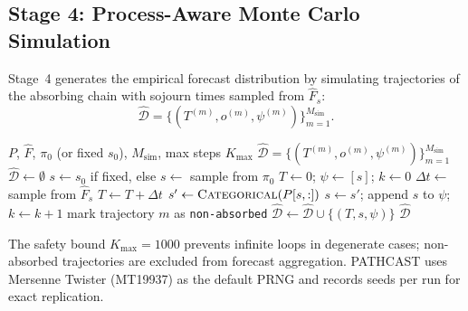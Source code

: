 \subsection{Stage 4: Process-Aware Monte Carlo Simulation}
\label{sec:stages-s4}

Stage~4 generates the empirical forecast distribution by simulating
trajectories of the absorbing chain with sojourn times sampled from
$\hat{F}_s$:
\begin{equation}
\label{eq:forecast-distribution}
\hat{\mathcal{D}}
  = \{(T^{(m)}, o^{(m)}, \psi^{(m)})\}_{m=1}^{M_{\text{sim}}}.
\end{equation}

\begin{algorithm}[htbp]
\caption{Process-Aware Monte Carlo Simulation}
\label{alg:mc-full}
\begin{algorithmic}[1]
\REQUIRE $P$, $\hat{F}$, $\pi_0$ (or fixed $s_0$), $M_{\text{sim}}$,
    max steps $K_{\max}$
\ENSURE $\hat{\mathcal{D}}
    = \{(T^{(m)}, o^{(m)}, \psi^{(m)})\}_{m=1}^{M_{\text{sim}}}$
\STATE $\hat{\mathcal{D}} \gets \emptyset$
    \STATE $s \gets s_0$ if fixed, else $s \gets$ sample from $\pi_0$
    \STATE $T \gets 0$; $\psi \gets [s]$; $k \gets 0$
        \STATE $\Delta t \gets$ sample from $\hat{F}_s$
        \STATE $T \gets T + \Delta t$
        \STATE $s' \gets \textsc{Categorical}(P[s, :])$
        \STATE $s \gets s'$; append $s$ to $\psi$; $k \gets k + 1$
    \ENDWHILE
        \STATE mark trajectory $m$ as \texttt{non-absorbed}
    \ENDIF
    \STATE $\hat{\mathcal{D}} \gets \hat{\mathcal{D}}
        \cup \{(T, s, \psi)\}$
\ENDFOR
\RETURN $\hat{\mathcal{D}}$
\end{algorithmic}
\end{algorithm}

The safety bound $K_{\max} = 1000$ prevents infinite loops in
degenerate cases; non-absorbed trajectories are excluded from
forecast aggregation. PATHCAST uses Mersenne Twister (MT19937) as the default PRNG and
records seeds per run for exact replication.

